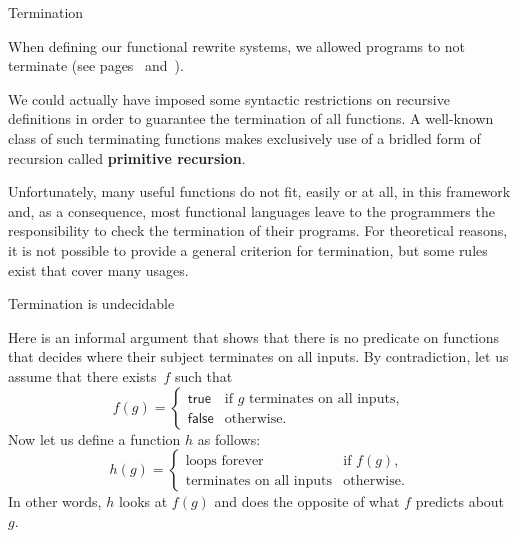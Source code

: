 %
\begin{frame}{Termination}

  When defining our functional rewrite systems, we allowed programs to
  not terminate (see pages~\pageref{termination1}
  and~\pageref{termination2}).

  \bigskip

  We could actually have imposed some syntactic restrictions on
  recursive definitions in order to guarantee the termination of all
  functions. A well\hyp{}known class of such terminating functions
  makes exclusively use of a bridled form of recursion called
  \textbf{primitive recursion}.

  \bigskip

  Unfortunately, many useful functions do not fit, easily or at all,
  in this framework and, as a consequence, most functional languages
  leave to the programmers the responsibility to check the termination
  of their programs. For theoretical reasons, it is not possible to
  provide a general criterion for termination, but some rules exist
  that cover many usages.

\end{frame}

%
\begin{frame}{Termination is undecidable}

  Here is an informal argument that shows that there is no predicate
  on functions that decides where their subject terminates on all
  inputs. By contradiction, let us assume that there exists~\(f\) such that
  \begin{equation*}
    f(g) =
    \begin{cases}
      \mathsf{true}  & \text{if $g$ terminates on all inputs},\\
      \mathsf{false} & \text{otherwise}.
    \end{cases}
  \end{equation*}
  Now let us define a function \(h\) as follows:
  \begin{equation*}
    h(g) =
    \begin{cases}
      \text{loops forever}            & \text{if $f(g)$},\\
      \text{terminates on all inputs} & \text{otherwise.}
    \end{cases}
  \end{equation*}
  In other words, \(h\) looks at \(f(g)\) and does the opposite of
  what \(f\) predicts about \(g\).

\end{frame}


